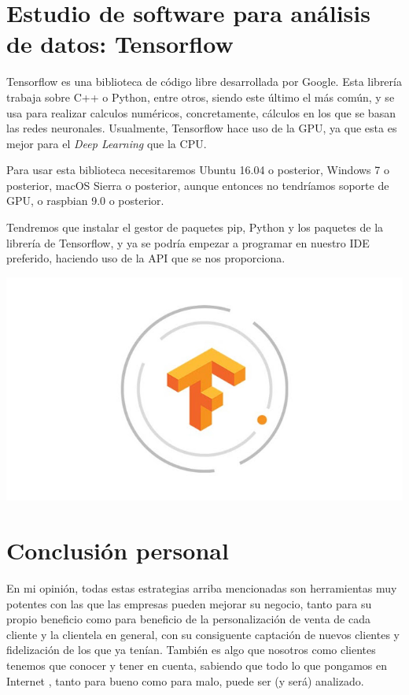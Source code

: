 \documentclass{article}
\begin{document}
\section{Estudio de software para análisis de datos: Tensorflow}
Tensorflow es una biblioteca de código libre desarrollada por Google. Esta librería trabaja sobre C++ o Python, entre otros, siendo este último el más común, y se usa para realizar calculos numéricos, concretamente, cálculos en los que se basan las redes neuronales. Usualmente, Tensorflow hace uso de la GPU, ya que esta es mejor para el \textit{Deep Learning} que la CPU.

Para usar esta biblioteca necesitaremos Ubuntu 16.04 o posterior, Windows 7 o posterior, macOS Sierra o posterior, aunque entonces no tendríamos soporte de GPU, o raspbian 9.0 o posterior.

Tendremos que instalar el gestor de paquetes pip, Python y los paquetes de la librería de Tensorflow, y ya se podría empezar a programar en nuestro IDE preferido, haciendo uso de la API que se nos proporciona.

\begin{flushleft}
\includegraphics[scale=0.5]{tensorflow.jpg} 
\end{flushleft}

\section{Conclusión personal}
En mi opinión, todas estas estrategias arriba mencionadas son herramientas muy potentes con las que las empresas pueden mejorar su negocio, tanto para su propio beneficio como para beneficio de la personalización de venta de cada cliente y la clientela en general, con su consiguente captación de nuevos clientes y fidelización de los que ya tenían. También es algo que nosotros como clientes tenemos que conocer y tener en cuenta, sabiendo que todo lo que pongamos en Internet , tanto para bueno como para malo, puede ser (y será) analizado.
\end{document}
